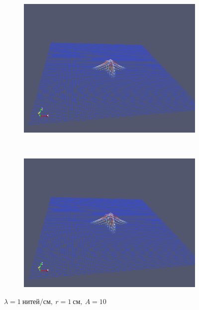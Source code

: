 \begin{figure}[H]
\begin{subfigure}[t]{0.5\textwidth}
        \includegraphics[width=\textwidth]{img/fiber/density_1_radius_1_amplitude_10/5.png}
    \end{subfigure}%
    ~
    \begin{subfigure}[t]{0.5\textwidth}
        \centering
        \includegraphics[width=\textwidth]{img/fiber/density_1_radius_1_amplitude_10/6.png}
    \end{subfigure}
    \caption{$\lambda=1~нитей/см,~r=1~см,~A=10$}
\end{figure}
